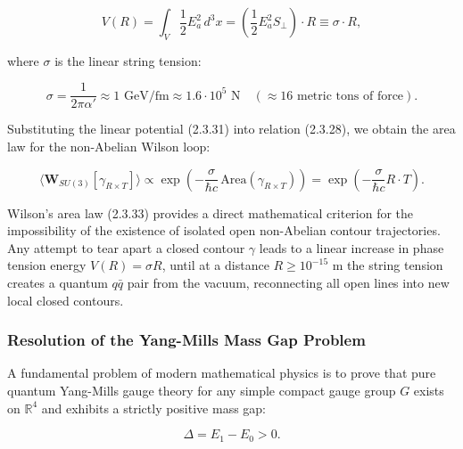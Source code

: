 \begin{equation}\label{eq:2.3.31}\tag{2.3.31}
V(R) = \int_{V} \frac{1}{2} E_a^2 \, d^3x = \left( \frac{1}{2} E_a^2 S_\perp \right) \cdot R \equiv \sigma \cdot R,
\end{equation}

where $\sigma$ is the linear string tension:

\begin{equation}\label{eq:2.3.32}\tag{2.3.32}
\sigma = \frac{1}{2\pi \alpha'} \approx 1\text{ GeV/fm} \approx 1.6 \cdot 10^5\text{ N} \quad (\approx 16\text{ metric tons of force}).
\end{equation}

Substituting the linear potential (2.3.31) into relation (2.3.28), we obtain the area law for the non-Abelian Wilson loop:

\begin{equation}\label{eq:2.3.33}\tag{2.3.33}
\langle \mathbf{W}_{SU(3)}[\gamma_{R \times T}] \rangle \propto \exp\left( - \frac{\sigma}{\hbar c} \, \text{Area}(\gamma_{R \times T}) \right) = \exp\left( - \frac{\sigma}{\hbar c} R \cdot T \right).
\end{equation}

\begin{theorem}\label{thm:2.3.3}
Wilson's area law (2.3.33) provides a direct mathematical criterion for the impossibility of the existence of isolated open non-Abelian contour trajectories. Any attempt to tear apart a closed contour $\gamma$ leads to a linear increase in phase tension energy $V(R) = \sigma R$, until at a distance $R \ge 10^{-15}\text{ m}$ the string tension creates a quantum $q\bar{q}$ pair from the vacuum, reconnecting all open lines into new local closed contours.
\end{theorem}

\subsubsection{Resolution of the Yang-Mills Mass Gap Problem}\label{sec:2.3.6}

A fundamental problem of modern mathematical physics is to prove that pure quantum Yang-Mills gauge theory for any simple compact gauge group $G$ exists on $\mathbb{R}^4$ and exhibits a strictly positive mass gap:

\begin{equation}\label{eq:2.3.34}\tag{2.3.34}
\Delta = E_1 - E_0 > 0.
\end{equation}

